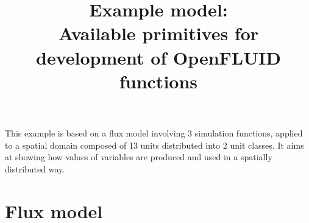 \documentclass[a4paper,11pt]{article}
\begin{document}
\title{Example model:\\Available primitives for development of OpenFLUID functions}
\maketitle


This example is based on a flux model involving 3 simulation functions, 
applied to a spatial domain composed of 13 units distributed into 2 unit classes. 
It aims at showing how values of variables are produced and used in a spatially distributed way.

\bigskip
\bigskip

\section{Flux model}
\end{document}

